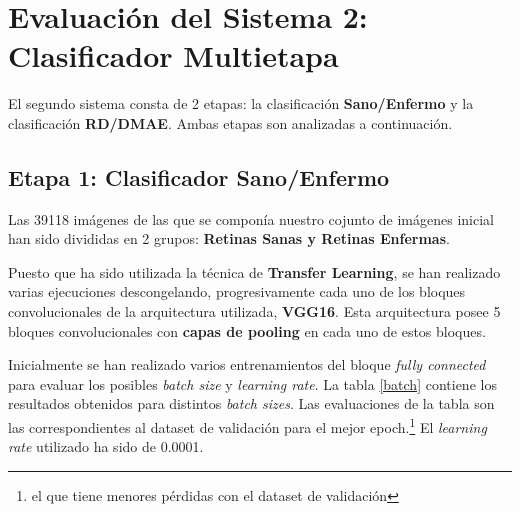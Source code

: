 \documentclass[
  12pt,
  spanish,
  a4paperpaper,
]{report}
\begin{document}
\hypertarget{evaluaciuxf3n-del-sistema-2-clasificador-multietapa}{%
\section{Evaluación del Sistema 2: Clasificador
Multietapa}\label{evaluaciuxf3n-del-sistema-2-clasificador-multietapa}}

El segundo sistema consta de 2 etapas: la clasificación
\textbf{Sano/Enfermo} y la clasificación \textbf{RD/DMAE}. Ambas etapas
son analizadas a continuación.

\hypertarget{etapa-1-clasificador-sanoenfermo}{%
\subsection{Etapa 1: Clasificador
Sano/Enfermo}\label{etapa-1-clasificador-sanoenfermo}}

Las 39118 imágenes de las que se componía nuestro cojunto de imágenes
inicial han sido divididas en 2 grupos: \textbf{Retinas Sanas y Retinas
Enfermas}.

Puesto que ha sido utilizada la técnica de \textbf{Transfer Learning},
se han realizado varias ejecuciones descongelando, progresivamente cada
uno de los bloques convolucionales de la arquitectura utilizada,
\textbf{VGG16}. Esta arquitectura posee 5 bloques convolucionales con
\textbf{capas de pooling} en cada uno de estos bloques.

Inicialmente se han realizado varios entrenamientos del bloque
\emph{fully connected} para evaluar los posibles \emph{batch size} y
\emph{learning rate}. La tabla \ref{batch} contiene los resultados
obtenidos para distintos \emph{batch sizes}. Las evaluaciones de la
tabla son las correspondientes al dataset de validación para el mejor
epoch.\footnote{el que tiene menores pérdidas con el dataset de
  validación} El \emph{learning rate} utilizado ha sido de 0.0001.

\newpage
\end{document}
